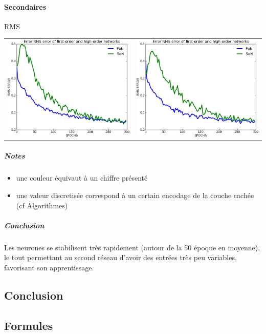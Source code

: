     \paragraph{Secondaires}
      RMS
      \begin{center}
	\begin{tabular}{lr}
	  \hspace*{-1cm}
	  \includegraphics[width=250px]{data/expC2/rms_25.png}
	  &
	  \includegraphics[width=250px]{data/expC2/rms_100.png} 
	\end{tabular}
      \end{center} 
      \subparagraph{Notes}
	\begin{itemize}
	  \item une couleur équivaut à un chiffre présenté
	  \item une valeur discretisée correspond à un certain encodage de la couche cachée (cf Algorithmes)
	\end{itemize}
      \subparagraph{Conclusion}
	Les neurones se stabilisent très rapidement (autour de la 50 époque en moyenne), 
	le tout permettant au second réseau d'avoir des entrées très peu variables, favorisant
	son apprentissage.


  \subsection{Conclusion}
  
  

  \newpage 
  \subsection{Formules}
    
    
    
    



